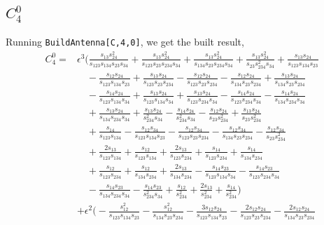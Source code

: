 \subsection{$C_4^0$}

Running \texttt{BuildAntenna[C,4,0]}, we get the built result,
\begin{align}
    C_4^0 = {}
    & \epsilon^3 \Bigg(
  \frac{s_{13}s_{24}^2}{s_{123}s_{134}s_{23}s_{34}} + \frac{s_{13}s_{24}^2}{s_{123}s_{23}s_{234}s_{34}} + \frac{s_{13}s_{24}^2}{s_{134}s_{23}s_{234}s_{34}} + \frac{s_{13}s_{24}^2}{s_{23}s_{234}^2s_{34}} + \frac{s_{13}s_{24}}{s_{123}s_{134}s_{23}} \nonumber \\
  & \quad - \frac{s_{12}s_{24}}{s_{123}s_{134}s_{23}} + \frac{s_{13}s_{24}}{s_{123}s_{23}s_{234}} - \frac{s_{12}s_{24}}{s_{123}s_{23}s_{234}} - \frac{s_{12}s_{24}}{s_{134}s_{23}s_{234}} + \frac{s_{13}s_{24}}{s_{134}s_{23}s_{234}} \nonumber \\
  & \quad - \frac{s_{14}s_{24}}{s_{123}s_{134}s_{34}} + \frac{s_{13}s_{24}}{s_{123}s_{134}s_{34}} + \frac{s_{13}s_{24}}{s_{123}s_{234}s_{34}} - \frac{s_{14}s_{24}}{s_{123}s_{234}s_{34}} - \frac{s_{14}s_{24}}{s_{134}s_{234}s_{34}} \nonumber \\
  & \quad + \frac{s_{13}s_{24}}{s_{134}s_{234}s_{34}} + \frac{s_{13}s_{24}}{s_{234}^2s_{34}} - \frac{s_{14}s_{24}}{s_{234}^2s_{34}} - \frac{s_{12}s_{24}}{s_{23}s_{234}^2} + \frac{s_{13}s_{24}}{s_{23}s_{234}^2} \nonumber \\
  & \quad + \frac{s_{14}}{s_{123}s_{134}} - \frac{s_{12}s_{34}}{s_{123}s_{134}s_{23}} - \frac{s_{12}s_{34}}{s_{123}s_{23}s_{234}} - \frac{s_{12}s_{34}}{s_{134}s_{23}s_{234}} - \frac{s_{12}s_{34}}{s_{23}s_{234}^2} \nonumber \\
  & \quad + \frac{2s_{13}}{s_{123}s_{134}} + \frac{s_{12}}{s_{123}s_{134}} + \frac{2s_{13}}{s_{123}s_{234}} + \frac{s_{14}}{s_{123}s_{234}} + \frac{s_{14}}{s_{134}s_{234}} \nonumber \\
  & \quad + \frac{s_{12}}{s_{123}s_{234}} + \frac{s_{12}}{s_{134}s_{234}} + \frac{2s_{13}}{s_{134}s_{234}} - \frac{s_{14}s_{23}}{s_{123}s_{134}s_{34}} - \frac{s_{14}s_{23}}{s_{123}s_{234}s_{34}} \nonumber \\
  & \quad - \frac{s_{14}s_{23}}{s_{134}s_{234}s_{34}} - \frac{s_{14}s_{23}}{s_{234}^2s_{34}} + \frac{s_{12}}{s_{234}^2} + \frac{2s_{13}}{s_{234}^2} + \frac{s_{14}}{s_{234}^2} \Bigg) \nonumber \\
& + \epsilon^2 \Bigg(
  - \frac{s_{12}^2}{s_{123}s_{134}s_{23}} - \frac{s_{12}^2}{s_{134}s_{23}s_{234}} - \frac{3s_{12}s_{24}}{s_{123}s_{134}s_{23}} - \frac{2s_{12}s_{24}}{s_{123}s_{23}s_{234}} - \frac{2s_{12}s_{24}}{s_{134}s_{23}s_{234}} \nonumber \\

\end{align}
